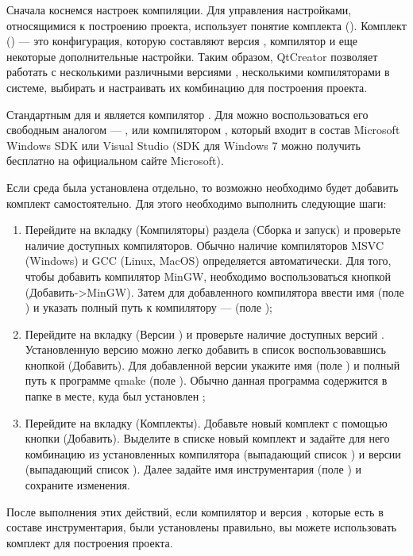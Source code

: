 Сначала коснемся настроек компиляции. Для управления настройками, относящимися к построению проекта, 
 использует понятие комплекта (). Комплект () --- это конфигурация, 
которую составляют версия , компилятор и еще
некоторые дополнительные настройки. Таким образом, QtCreator позволяет работать с несколькими различными версиями ,
несколькими компиляторами в системе, выбирать и настраивать их комбинацию для построения проекта.

Стандартным для  и  является компилятор . Для  можно воспользоваться его свободным
аналогом --- , или компилятором , который входит в состав Microsoft Windows SDK или Visual Studio (SDK для Windows 7 можно получить бесплатно на официальном сайте Microsoft).

Если среда  была установлена отдельно, то возможно
необходимо будет добавить комплект самостоятельно. Для
этого необходимо выполнить следующие шаги:

\begin{enumerate}
\item Перейдите на вкладку  (Компиляторы) раздела 
(Сборка и запуск) и проверьте наличие доступных компиляторов. Обычно
наличие компиляторов MSVC (Windows) и GCC (Linux, MacOS) определяется автоматически. Для того, чтобы добавить
компилятор MinGW, необходимо воспользоваться кнопкой
(Добавить->MinGW).
Затем для добавленного компилятора ввести имя (поле ) и указать полный путь к
компилятору  ---  (поле );
\item Перейдите на вкладку  (Версии ) и проверьте наличие доступных
версий . Установленную версию можно легко добавить в список воспользовавшись кнопкой
(Добавить). Для добавленной версии укажите имя
(поле ) и полный путь к программе qmake 
(поле ). Обычно
данная программа содержится в папке  в месте, куда был установлен ;
\item Перейдите на вкладку  (Комплекты). Добавьте новый комплект
с помощью кнопки  (Добавить).
Выделите в списке новый комплект и задайте для него комбинацию из
установленных компилятора (выпадающий список ) и версии 
(выпадающий список ). Далее задайте имя инструментария (поле ) и сохраните изменения.
\end{enumerate}
После выполнения этих действий, если компилятор и версия , которые есть в составе инструментария, были
установлены правильно, вы можете использовать комплект для построения проекта.

